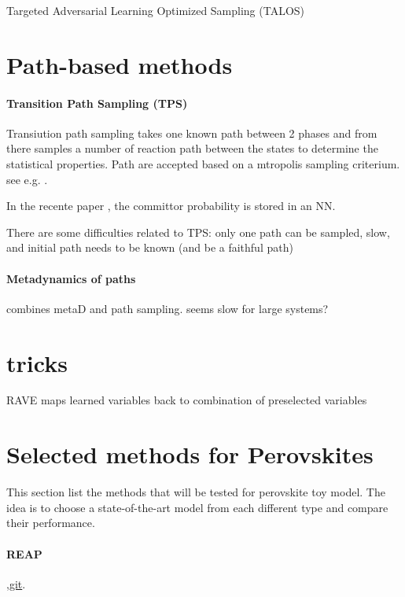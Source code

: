 \documentclass{article}
\begin{document}
Targeted Adversarial Learning Optimized Sampling (TALOS) \cite{Zhang2019}

\section{Path-based methods}

\paragraph{Transition Path Sampling (TPS) }

Transiution path sampling takes one known path between 2 phases and from there samples a number of reaction path between the states to determine the statistical properties. Path are accepted based on a mtropolis sampling criterium. see e.g. \cite{Dellago1998}.

In the recente paper \cite{Jung2019}, the committor probability is stored in an NN.

There are some difficulties related to TPS: only one path can be sampled, slow, and initial path needs to be known (and be a faithful path)

\paragraph{Metadynamics of paths } \cite{Mandelli2020} combines metaD and path sampling. seems slow for large systems?

\section{tricks}

RAVE maps learned variables back to combination of preselected variables

\section{Selected methods for Perovskites}

This section list the methods that will be tested for perovskite toy model. The idea is to choose a state-of-the-art model from each different type and compare their performance.

\paragraph{REAP} \cite{Shamsi2018},\href{https://github.com/ShuklaGroup/REAP-ReinforcementLearningBasedAdaptiveSampling}{git}.
\end{document}

